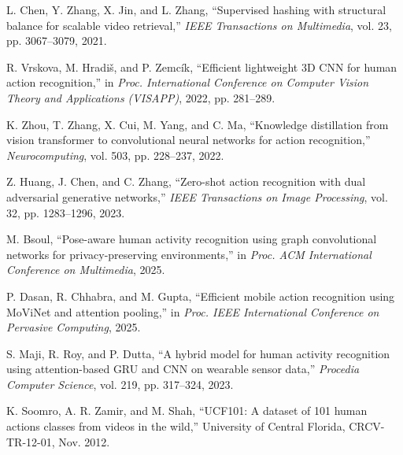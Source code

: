 \documentclass[conference]{IEEEtran}
\begin{document}
\begin{thebibliography}{00}
L. Chen, Y. Zhang, X. Jin, and L. Zhang, ``Supervised hashing with structural balance for scalable video retrieval,'' \textit{IEEE Transactions on Multimedia}, vol. 23, pp. 3067–3079, 2021.

R. Vrskova, M. Hradiš, and P. Zemcík, ``Efficient lightweight 3D CNN for human action recognition,'' in \textit{Proc. International Conference on Computer Vision Theory and Applications (VISAPP)}, 2022, pp. 281–289.

K. Zhou, T. Zhang, X. Cui, M. Yang, and C. Ma, ``Knowledge distillation from vision transformer to convolutional neural networks for action recognition,'' \textit{Neurocomputing}, vol. 503, pp. 228–237, 2022.

Z. Huang, J. Chen, and C. Zhang, ``Zero-shot action recognition with dual adversarial generative networks,'' \textit{IEEE Transactions on Image Processing}, vol. 32, pp. 1283–1296, 2023.

M. Bsoul, ``Pose-aware human activity recognition using graph convolutional networks for privacy-preserving environments,'' in \textit{Proc. ACM International Conference on Multimedia}, 2025.

P. Dasan, R. Chhabra, and M. Gupta, ``Efficient mobile action recognition using MoViNet and attention pooling,'' in \textit{Proc. IEEE International Conference on Pervasive Computing}, 2025.

S. Maji, R. Roy, and P. Dutta, ``A hybrid model for human activity recognition using attention-based GRU and CNN on wearable sensor data,'' \textit{Procedia Computer Science}, vol. 219, pp. 317–324, 2023.

K. Soomro, A. R. Zamir, and M. Shah, ``UCF101: A dataset of 101 human actions classes from videos in the wild,'' University of Central Florida, CRCV-TR-12-01, Nov. 2012.


\end{thebibliography}
\end{document}
